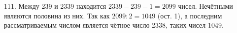 111. Между 239 и 2339 находится $2339-239-1=2099$ чисел. Нечётными являются половина из них. Так как $2099:2=1049$ (ост. 1), а последним рассматриваемым числом является чётное число 2338, таких чисел 1049.\\
